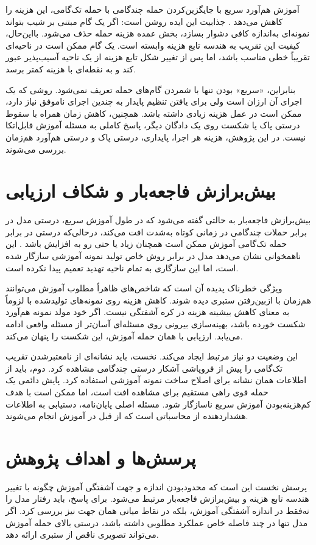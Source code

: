 آموزش هم‌آورد سریع با جایگزین‌کردن حمله چندگامی با حمله تک‌گامی، این هزینه را کاهش می‌دهد \cite{wong2020fast}. جذابیت این ایده روشن است: اگر یک گام مبتنی بر شیب بتواند نمونه‌ای به‌اندازه کافی دشوار بسازد، بخش عمده هزینه حمله حذف می‌شود. بااین‌حال، کیفیت این تقریب به هندسه تابع هزینه وابسته است. یک گام ممکن است در ناحیه‌ای تقریباً خطی مناسب باشد، اما پس از تغییر شکل تابع هزینه از یک ناحیه آسیب‌پذیر عبور کند و به نقطه‌ای با هزینه کمتر برسد.

بنابراین، «سریع» بودن تنها با شمردن گام‌های حمله تعریف نمی‌شود. روشی که یک اجرای آن ارزان است ولی برای یافتن تنظیم پایدار به چندین اجرای ناموفق نیاز دارد، ممکن است در عمل هزینه زیادی داشته باشد. همچنین، کاهش زمان همراه با سقوط درستی پاک یا شکست روی یک دادگان دیگر، پاسخ کاملی به مسئله آموزش قابل‌اتکا نیست. در این پژوهش، هزینه هر اجرا، پایداری، درستی پاک و درستی هم‌آورد هم‌زمان بررسی می‌شوند.

\section{بیش‌برازش فاجعه‌بار و شکاف ارزیابی}
بیش‌برازش فاجعه‌بار به حالتی گفته می‌شود که در طول آموزش سریع، درستی مدل در برابر حملات چندگامی در زمانی کوتاه به‌شدت افت می‌کند، درحالی‌که درستی در برابر حمله تک‌گامی آموزش ممکن است همچنان زیاد یا حتی رو به افزایش باشد \cite{wong2020fast,andriushchenko2020understanding}. این ناهمخوانی نشان می‌دهد مدل در برابر روش خاص تولید نمونه آموزشی سازگار شده است، اما این سازگاری به تمام ناحیه تهدید تعمیم پیدا نکرده است.

ویژگی خطرناک پدیده آن است که شاخص‌های ظاهراً مطلوب آموزش می‌توانند هم‌زمان با ازبین‌رفتن ستبری دیده شوند. کاهش هزینه روی نمونه‌های تولیدشده با  لزوماً به معنای کاهش بیشینه هزینه در کره آشفتگی نیست. اگر خود مولد نمونه هم‌آورد شکست خورده باشد، بهینه‌سازی بیرونی روی مسئله‌ای آسان‌تر از مسئله واقعی ادامه می‌یابد. ارزیابی با همان حمله آموزش، این شکست را پنهان می‌کند.

این وضعیت دو نیاز مرتبط ایجاد می‌کند. نخست، باید نشانه‌ای از نامعتبرشدن تقریب تک‌گامی را پیش از فروپاشی آشکار درستی چندگامی مشاهده کرد. دوم، باید از اطلاعات همان نشانه برای اصلاح ساخت نمونه آموزشی استفاده کرد. پایش دائمی یک حمله قوی راهی مستقیم برای مشاهده افت است، اما ممکن است با هدف کم‌هزینه‌بودن آموزش سریع ناسازگار شود. مسئله اصلی پایان‌نامه، دستیابی به اطلاعات هشداردهنده از محاسباتی است که از قبل در آموزش انجام می‌شوند.

\section{پرسش‌ها و اهداف پژوهش}
پرسش نخست این است که محدودبودن اندازه و جهت آشفتگی آموزش چگونه با تغییر هندسه تابع هزینه و بیش‌برازش فاجعه‌بار مرتبط می‌شود. برای پاسخ، باید رفتار مدل را نه‌فقط در اندازه آشفتگی آموزش، بلکه در نقاط میانی همان جهت نیز بررسی کرد. اگر مدل تنها در چند فاصله خاص عملکرد مطلوبی داشته باشد، درستی بالای حمله آموزش می‌تواند تصویری ناقص از ستبری ارائه دهد.

